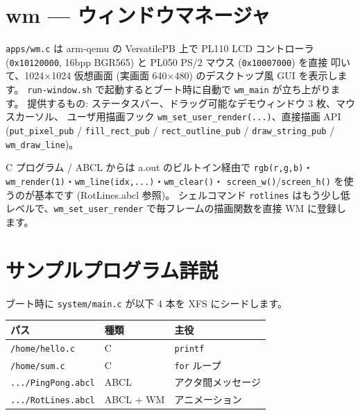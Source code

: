 \documentclass[a4paper,11pt]{ltjsarticle}
\begin{document}
\section{wm --- ウィンドウマネージャ}
\verb|apps/wm.c| は arm-qemu の VersatilePB 上で PL110 LCD コントローラ
(\verb|0x10120000|, 16bpp BGR565) と PL050 PS/2 マウス (\verb|0x10007000|) を直接
叩いて、1024×1024 仮想画面 (実画面 640×480) のデスクトップ風 GUI を表示します。
\verb|run-window.sh| で起動するとブート時に自動で \verb|wm_main| が立ち上がります。
提供するもの: ステータスバー、ドラッグ可能なデモウィンドウ 3 枚、マウスカーソル、
ユーザ用描画フック \verb|wm_set_user_render(...)|、直接描画 API
(\verb|put_pixel_pub| / \verb|fill_rect_pub| / \verb|rect_outline_pub| /
\verb|draw_string_pub| / \verb|wm_draw_line|)。

C プログラム / ABCL からは a.out のビルトイン経由で \verb|rgb(r,g,b)|・
\verb|wm_render(1)|・\verb|wm_line(idx,...)|・\verb|wm_clear()|・
\verb|screen_w()|/\verb|screen_h()| を使うのが基本です (RotLines.abcl 参照)。
シェルコマンド \verb|rotlines| はもう少し低レベルで、\verb|wm_set_user_render|
で毎フレームの描画関数を直接 WM に登録します。

\section{サンプルプログラム詳説}
ブート時に \verb|system/main.c| が以下 4 本を XFS にシードします。
\begin{center}\footnotesize
\begin{tabular}{@{}l l l@{}}
\toprule \textbf{パス} & \textbf{種類} & \textbf{主役}\\ \midrule
\verb|/home/hello.c| & C & \verb|printf|\\
\verb|/home/sum.c|   & C & \verb|for| ループ\\
\verb|.../PingPong.abcl| & ABCL & アクタ間メッセージ\\
\verb|.../RotLines.abcl| & ABCL + WM & アニメーション\\
\bottomrule
\end{tabular}
\end{center}
\end{document}
